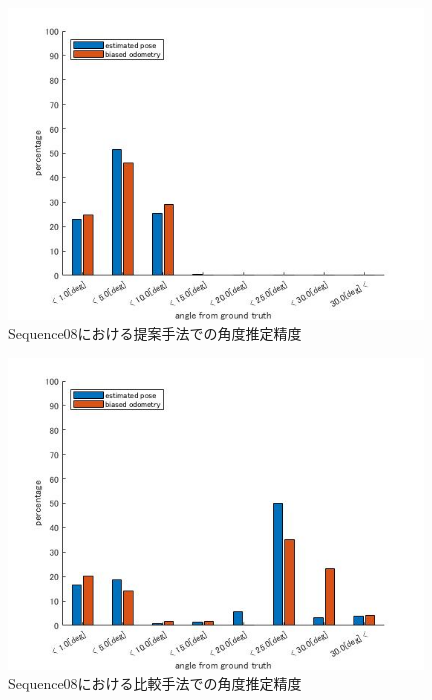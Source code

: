 \begin{figure}[htbp]
  \begin{minipage}{1.0\hsize}
  \begin{center}
   \includegraphics[width=110mm]{./picture/mesh_s8_rpy.jpg}
  \end{center}
  \caption{Sequence08における提案手法での角度推定精度}
  \label{fig:mesh_sequence08_RPY}
 \end{minipage}
\end{figure}

\begin{figure}[htbp]
 \begin{minipage}{1.0\hsize}
  \begin{center}
   \includegraphics[width=110mm]{./picture/point_s8_rpy.jpg}
  \end{center}
  \caption{Sequence08における比較手法での角度推定精度}
  \label{fig:point_sequence08_RPY}
 \end{minipage}
\end{figure}


